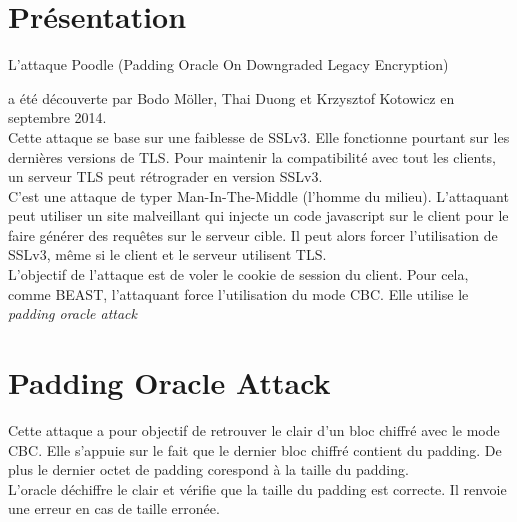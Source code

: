 
\chapter{Présentation}
\label{chapter:poodlePres}

L'attaque Poodle (Padding Oracle On Downgraded Legacy Encryption)

a été découverte par Bodo Möller, Thai Duong et 
Krzysztof Kotowicz\cite{article:ssl-poodle} en septembre 2014.\\

Cette attaque se base sur une faiblesse de SSLv3.
Elle fonctionne pourtant sur les dernières versions de TLS.
Pour maintenir la compatibilité avec tout les clients, un
serveur TLS peut rétrograder en version SSLv3.\\

C'est une attaque de typer Man-In-The-Middle (l'homme du milieu).
L'attaquant peut utiliser un site malveillant qui injecte un
code javascript sur le client pour le faire générer des requêtes
sur le serveur cible. Il peut alors forcer l'utilisation de 
SSLv3, même si le client et le serveur utilisent TLS.\\

L'objectif de l'attaque est de voler le cookie de session 
du client. Pour cela, comme BEAST, l'attaquant force 
l'utilisation du mode CBC. Elle utilise le \emph{padding oracle attack }

\chapter{Padding Oracle Attack}
\label{chapter:POA}

Cette attaque a pour objectif de retrouver le clair d'un bloc chiffré 
avec le mode CBC. Elle s'appuie sur le fait que le dernier bloc chiffré
contient du padding. De plus le dernier octet de padding corespond à la
taille du padding.\\

L'oracle  déchiffre le clair et vérifie que la taille du padding est correcte. 
Il renvoie une erreur en cas de taille erronée.\\

